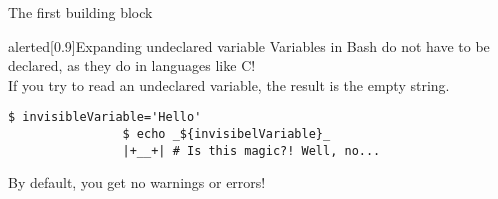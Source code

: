 \begin{frame}[fragile]{The first building block}
\begin{overlayarea}{\textwidth}{0.3\textheight}
\begin{varblock}{alerted}[0.9\textwidth]{Expanding undeclared variable}
            Variables in Bash do not have to be declared, as they do in languages like C!\\
            If you try to read an undeclared variable, the result is the empty string.\\
            \begin{lstlisting}[style=MyBash, numbers=none, belowskip=-5mm, xleftmargin=20mm, xrightmargin=20mm]
                $ invisibleVariable='Hello'
                $ echo _${invisibelVariable}_
                |+__+| # Is this magic?! Well, no...
            \end{lstlisting}
            \alert{By default, you get no warnings or errors!}
        \end{varblock}
    \end{overlayarea}
\end{frame}
